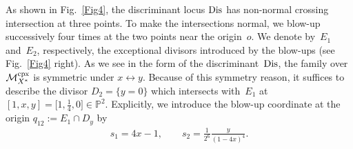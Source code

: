 \documentclass[10pt,a4paper]{amsart}
\numberwithin{equation}{section}
\begin{document}
As shown in Fig.~\ref{Fig4}, the discriminant locus ${\rm Dis}$ has non-normal crossing intersection at three points. To make the intersections normal, we blow-up successively four times at the two points near the origin~$o$. We denote by~$E_{1}$ and~$E_{2}$, respectively, the exceptional divisors introduced by the blow-ups (see Fig.~\ref{Fig4} right). As we see in the form of the discriminant~${\rm Dis}$, the family over $\mathcal{M}_{X^{*}}^{\rm cpx}$ is symmetric under $x\leftrightarrow y$. Because of this symmetry reason, it suffices to describe the divisor $D_{2}= \{ y=0\} $ which intersects with~$E_{1}$ at $[1,x,y]=\big[1,\frac{1}{4},0\big]\in\mathbb{P}^{2}$. Explicitly, we introduce the blow-up coordinate at the origin $q_{12}:=E_{1}\cap D_{y}$ by
\begin{gather*}
s_{1}=4x-1,\qquad s_{2}=\frac{1}{2^{6}}\frac{y}{(1-4x)^{4}}.
\end{gather*}
\end{document}
